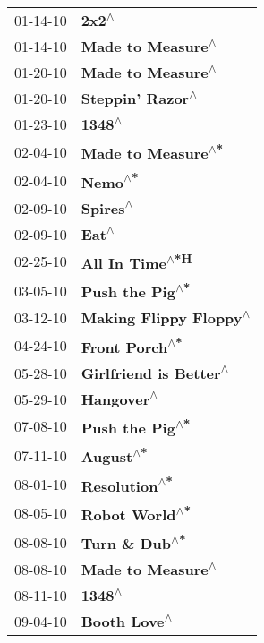 \begin{supertabular}{p{0.25\columnwidth}p{0.75\columnwidth}}
 01-14-10 &                   \textbf{2x2\textsuperscript{$\wedge$}} \\
 01-14-10 &       \textbf{Made to Measure\textsuperscript{$\wedge$}} \\
 01-20-10 &       \textbf{Made to Measure\textsuperscript{$\wedge$}} \\
 01-20-10 &        \textbf{Steppin' Razor\textsuperscript{$\wedge$}} \\
 01-23-10 &                  \textbf{1348\textsuperscript{$\wedge$}} \\
 02-04-10 &      \textbf{Made to Measure\textsuperscript{$\wedge$*}} \\
 02-04-10 &                 \textbf{Nemo\textsuperscript{$\wedge$*}} \\
 02-09-10 &                \textbf{Spires\textsuperscript{$\wedge$}} \\
 02-09-10 &                   \textbf{Eat\textsuperscript{$\wedge$}} \\
 02-25-10 &         \textbf{All In Time\textsuperscript{$\wedge$*H}} \\
 03-05-10 &         \textbf{Push the Pig\textsuperscript{$\wedge$*}} \\
 03-12-10 &  \textbf{Making Flippy Floppy\textsuperscript{$\wedge$}} \\
 04-24-10 &          \textbf{Front Porch\textsuperscript{$\wedge$*}} \\
 05-28-10 &  \textbf{Girlfriend is Better\textsuperscript{$\wedge$}} \\
 05-29-10 &              \textbf{Hangover\textsuperscript{$\wedge$}} \\
 07-08-10 &         \textbf{Push the Pig\textsuperscript{$\wedge$*}} \\
 07-11-10 &               \textbf{August\textsuperscript{$\wedge$*}} \\
 08-01-10 &           \textbf{Resolution\textsuperscript{$\wedge$*}} \\
 08-05-10 &          \textbf{Robot World\textsuperscript{$\wedge$*}} \\
 08-08-10 &          \textbf{Turn \& Dub\textsuperscript{$\wedge$*}} \\
 08-08-10 &       \textbf{Made to Measure\textsuperscript{$\wedge$}} \\
 08-11-10 &                  \textbf{1348\textsuperscript{$\wedge$}} \\
 09-04-10 &            \textbf{Booth Love\textsuperscript{$\wedge$}} \\

\end{supertabular}
